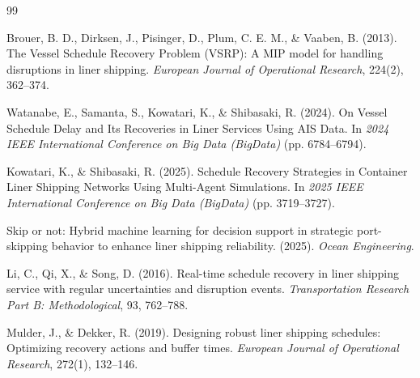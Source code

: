\documentclass[12pt]{article}
\begin{document}
\begin{thebibliography}{99}
 
Brouer, B. D., Dirksen, J., Pisinger, D., Plum, C. E. M., \& Vaaben, B. (2013). The Vessel
Schedule Recovery Problem (VSRP): A MIP model for handling disruptions in liner shipping.
\textit{European Journal of Operational Research}, 224(2), 362--374.
 
Watanabe, E., Samanta, S., Kowatari, K., \& Shibasaki, R. (2024). On Vessel Schedule Delay and
Its Recoveries in Liner Services Using AIS Data. In \textit{2024 IEEE International Conference
on Big Data (BigData)} (pp. 6784--6794).
 
Kowatari, K., \& Shibasaki, R. (2025). Schedule Recovery Strategies in Container Liner Shipping
Networks Using Multi-Agent Simulations. In \textit{2025 IEEE International Conference on Big
Data (BigData)} (pp. 3719--3727).
 
Skip or not: Hybrid machine learning for decision support in strategic port-skipping behavior to
enhance liner shipping reliability. (2025). \textit{Ocean Engineering}.
 
Li, C., Qi, X., \& Song, D. (2016). Real-time schedule recovery in liner shipping service with
regular uncertainties and disruption events. \textit{Transportation Research Part B:
Methodological}, 93, 762--788.
 
Mulder, J., \& Dekker, R. (2019). Designing robust liner shipping schedules: Optimizing recovery
actions and buffer times. \textit{European Journal of Operational Research}, 272(1), 132--146.
 
\end{thebibliography}
 
\end{document}
